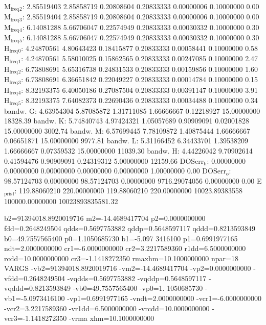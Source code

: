 \documentclass[11pt]{article}
\begin{document}
M\(_{\text{freq}}\)\(_{\text{2}}\):   2.85519403   2.85858719   0.20808604   0.20833333   0.00000006   0.10000000         0.00
M\(_{\text{freq}}\)\(_{\text{3}}\):   2.85519404   2.85858719   0.20808604   0.20833333   0.00000006   0.10000000         0.00
M\(_{\text{freq}}\)\(_{\text{4}}\):   6.14081288   5.66706047   0.22574949   0.20833333   0.00030332   0.10000000         0.30
M\(_{\text{freq}}\)\(_{\text{5}}\):   6.14081288   5.66706047   0.22574949   0.20833333   0.00030332   0.10000000         0.30
H\(_{\text{freq}}\)\(_{\text{0}}\):   4.24870561   4.80643423   0.18415877   0.20833333   0.00058441   0.10000000         0.58
H\(_{\text{freq}}\)\(_{\text{1}}\):   4.24870561   5.58010025   0.15862565   0.20833333   0.00247085   0.10000000         2.47
H\(_{\text{freq}}\)\(_{\text{2}}\):   6.73808691   5.65316738   0.24831533   0.20833333   0.00159856   0.10000000         1.60
H\(_{\text{freq}}\)\(_{\text{3}}\):   6.73808691   6.36651842   0.22049227   0.20833333   0.00014784   0.10000000         0.15
H\(_{\text{freq}}\)\(_{\text{4}}\):   8.32193375   6.40050186   0.27087504   0.20833333   0.00391147   0.10000000         3.91
H\(_{\text{freq}}\)\(_{\text{5}}\):   8.32193375   7.64082373   0.22690436   0.20833333   0.00034488   0.10000000         0.34
bandw. G:   4.63954304   5.87085872   1.31711085   1.66666667   0.12218927  15.00000000     18328.39
bandw. K:   5.74840743   4.97424321   1.05057689   0.90909091   0.02001828  15.00000000      3002.74
bandw. M:   6.57699445   7.78109872   1.40875444   1.66666667   0.06651871  15.00000000      9977.81
bandw. L:   5.31166452   6.34433701   1.39538209   1.66666667   0.07359532  15.00000000     11039.30
bandw. H:   4.44226042   9.70902614   0.41594476   0.90909091   0.24319312   5.00000000     12159.66
DOSerr\(_{\text{h}}\):   0.00000000   0.00000000   0.00000000   0.00000000   0.00000000   1.00000000         0.00
DOSerr\(_{\text{o}}\):  98.57124703   0.00000000  98.57124703   0.00000000 9716.29074056   0.00000000         0.00
E\(_{\text{pris}}\)\(_{\text{f}}\): 119.88060210 220.00000000 119.88060210 220.00000000 10023.89383558 100000.00000000 10023893835581.32



  b2=91394018.8920019716 m2=-14.4689417704 p2=0.0000000000 fdd=0.2648249504 qdds=0.5697753882 qddp=0.5648597117 qddd=0.8213593849 b0=49.7557565400 p0=1.1050685730 b1=-5.097
3416100 p1=0.6991977165 ndt=2.0000000000 cr1=-6.0000000000 cr2=3.2217589360 r1dd=6.5000000000 rcdd=10.0000000000 cr3=-1.1418272350 rmaxhm=10.1000000000 npar=18 
VARGS
    -vb2=91394018.8920019716 -vm2=-14.4689417704 -vp2=0.0000000000 -vfdd=0.2648249504 -vqdds=0.5697753882 -vqddp=0.5648597117 -vqddd=0.8213593849 -vb0=49.7557565400 -vp0=1.
1050685730 -vb1=-5.0973416100 -vp1=0.6991977165 -vndt=2.0000000000 -vcr1=-6.0000000000 -vcr2=3.2217589360 -vr1dd=6.5000000000 -vrcdd=10.0000000000 -vcr3=-1.1418272350 -vrma
xhm=10.1000000000 
\end{document}
